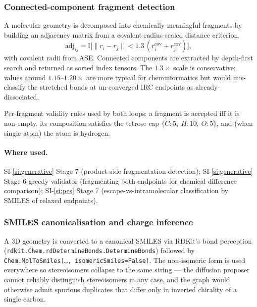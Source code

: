 \subsubsection{Connected-component fragment detection}
\label{sec:shared-fragments}

A molecular geometry is decomposed into chemically-meaningful fragments by building an adjacency matrix from a covalent-radius-scaled distance criterion,
\begin{equation}
    \text{adj}_{ij} = \mathbb{I}\bigl[\lVert r_i - r_j \rVert < 1.3\,(r^{\text{cov}}_i + r^{\text{cov}}_j)\bigr],
\end{equation}
with covalent radii from ASE. Connected components are extracted by depth-first search and returned as sorted index tensors. The $1.3\times$ scale is conservative; values around $1.15$--$1.20\times$ are more typical for cheminformatics but would mis-classify the stretched bonds at un-converged IRC endpoints as already-dissociated.

Per-fragment validity rules used by both loops: a fragment is accepted iff it is non-empty, its composition satisfies the tetrose cap $\{C{:}5,\ H{:}10,\ O{:}5\}$, and (when single-atom) the atom is hydrogen.

\paragraph{Where used.}
SI-\ref{si:generative} Stage 7 (product-side fragmentation detection); SI-\ref{si:generative} Stage 6 greedy validator (fragmenting both endpoints for chemical-difference comparison); SI-\ref{si:pes} Stage 7 (escape-vs-intramolecular classification by SMILES of relaxed endpoints).


\subsubsection{SMILES canonicalisation and charge inference}
\label{sec:shared-smiles}

A 3D geometry is converted to a canonical SMILES via RDKit's bond perception (\texttt{rdkit.Chem.rdDetermineBonds.DetermineBonds}) followed by \texttt{Chem.MolToSmiles(\dots, isomericSmiles=False)}. The non-isomeric form is used everywhere so stereoisomers collapse to the same string --- the diffusion proposer cannot reliably distinguish stereoisomers in any case, and the graph would otherwise admit spurious duplicates that differ only in inverted chirality of a single carbon.

